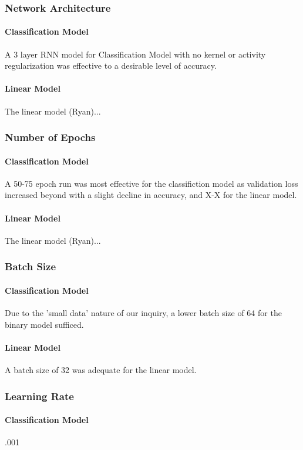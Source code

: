 \documentclass{article}
\begin{document}
\begin{multicols}{2}
\subsubsection{Network Architecture}
\paragraph{Classification Model}
A 3 layer RNN model for Classification Model with no kernel or activity regularization was effective to a desirable level of accuracy.
\paragraph{Linear Model}
The linear model (Ryan)...
\subsubsection{Number of Epochs}
\paragraph{Classification Model}
A 50-75 epoch run was most effective for the classifiction model as validation loss increased beyond with a slight decline in accuracy, and X-X for the linear model.
\paragraph{Linear Model}
The linear model (Ryan)...
\subsubsection{Batch Size}
\paragraph{Classification Model}
Due to the 'small data' nature of our inquiry, a lower batch size of 64 for the binary model sufficed.
\paragraph{Linear Model}
A batch size of 32 was adequate for the linear model.
\subsubsection{Learning Rate}
\paragraph{Classification Model}
.001

\end{multicols}
\end{document}
